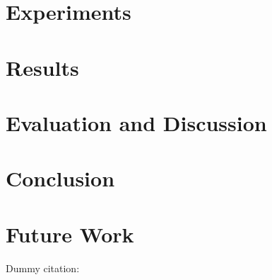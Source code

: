 \documentclass[10pt,sts]{article}
\begin{document}
    \section{Experiments}

    \section{Results}

    \section{Evaluation and Discussion}

    \section{Conclusion}

    \section{Future Work}

    Dummy citation: ~\citep{halpern08}




\end{document}

